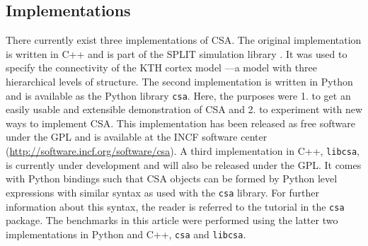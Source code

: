 \documentclass{frontiersSCNS} %
\begin{document}
\subsection{Implementations}\label{sec:impl}

There currently exist three implementations of CSA.  The original
implementation is written in C++ and is part of the SPLIT simulation
library \citep{djurfeldt05}.  It was used to specify the connectivity
of the KTH cortex model \citep{djurfeldt08}---a model with three
hierarchical levels of structure.  The second implementation is
written in Python and is available as the Python library \verb|csa|.
Here, the purposes were 1. to get an easily usable and extensible
demonstration of CSA and 2. to experiment with new ways to implement
CSA. This implementation has been released as free software under the
GPL and is available at the INCF software center
(\url{http://software.incf.org/software/csa}). A third implementation
in C++, \verb|libcsa|, is currently under development and will also be
released under the GPL. It comes with Python bindings such that CSA
objects can be formed by Python level expressions with similar syntax
as used with the \verb|csa| library. For further information about
this syntax, the reader is referred to the tutorial in the \verb|csa|
package. The benchmarks in this article were performed using the
latter two implementations in Python and C++, \verb|csa| and
\verb|libcsa|.


\end{document}

